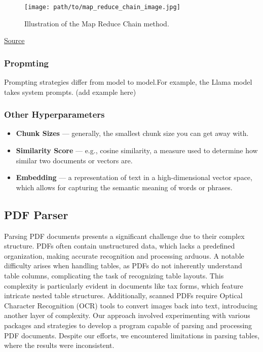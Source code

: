 \documentclass{scrartcl}
\begin{document}
\begin{figure}[H]
    \centering
    \texttt{[image: path/to/map\_reduce\_chain\_image.jpg]}
    \caption{Illustration of the Map Reduce Chain method.}
\end{figure}
\href{https://readmedium.com/en/https:/ogre51.medium.com/types-of-chains-in-langchain-823c8878c2e9}{Source}

\subsubsection{Propmting}
Prompting strategies differ from model to model.For example, the Llama model takes system prompts.
(add example here)
\subsubsection{Other Hyperparameters}
\begin{itemize}
    \item \textbf{Chunk Sizes} --- generally, the smallest chunk size you can get away with.
    \item \textbf{Similarity Score} --- e.g., cosine similarity, a measure used to determine how similar two documents or vectors are.
    \item \textbf{Embedding} --- a representation of text in a high-dimensional vector space, which allows for capturing the semantic meaning of words or phrases.
\end{itemize}

\subsection {PDF Parser}
Parsing PDF documents presents a significant challenge due to their complex structure. PDFs often contain unstructured data, which lacks a predefined organization, making accurate recognition and processing arduous. A notable difficulty arises when handling tables, as PDFs do not inherently understand table columns, complicating the task of recognizing table layouts. This complexity is particularly evident in documents like tax forms, which feature intricate nested table structures. Additionally, scanned PDFs require Optical Character Recognition (OCR) tools to convert images back into text, introducing another layer of complexity.
Our approach involved experimenting with various packages and strategies to develop a program capable of parsing and processing PDF documents. Despite our efforts, we encountered limitations in parsing tables, where the results were inconsistent.
\end{document}

